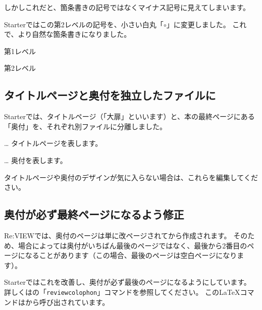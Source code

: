しかしこれだと、箇条書きの記号ではなくマイナス記号に見えてしまいます。

Starterではこの第2レベルの記号を、小さい白丸「$\circ$」に変更しました。
これで、より自然な箇条書きになりました。

\noindent
{}

\starterresult

\begin{starteritemize}
\item 第1レベル

\begin{starteritemize}
\item 第2レベル
\end{starteritemize}

\end{starteritemize}

\endstarterresult

\subsection*{タイトルページと奥付を独立したファイルに}
\label{sec:1-2-16}

Starterでは、タイトルページ（「大扉」といいます）と、本の最終ページにある「奥付」を、それぞれ別ファイルに分離しました。

\begin{starteritemize}
\item {} … タイトルページを表します。
\item {} … 奥付を表します。
\end{starteritemize}

タイトルページや奥付のデザインが気に入らない場合は、これらを編集してください。

\subsection*{奥付が必ず最終ページになるよう修正}
\label{sec:1-2-17}

Re:VIEWでは、奥付のページは単に改ページされてから作成されます。
そのため、場合によっては奥付がいちばん最後のページではなく、最後から2番目のページになることがあります（この場合、最後のページは空白ページになります）。

Starterではこれを改善し、奥付が必ず最後のページになるようにしています。
詳しくはの「\texttt{\reviewbackslash{}reviewcolophon}」コマンドを参照してください。
この\LaTeX{}コマンドはから呼び出されています。

